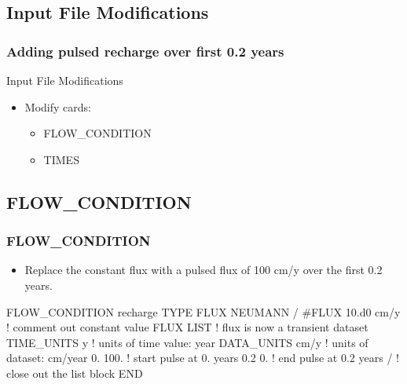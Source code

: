 \documentclass{beamer}
\newcommand\redcomment[1]{{{\color{red} #1}}}
\newcommand\bluecomment[1]{{{\color{blue} #1}}}
\newcommand\magentacomment[1]{{{\color{magenta} #1}}}
\begin{document}
\subsection{Input File Modifications}

\begin{frame}[fragile]\frametitle{Adding pulsed recharge over first 0.2 years}


Input File Modifications
\begin{itemize}
\item Modify cards:
  \begin{itemize}
    \item FLOW\_CONDITION
    \item TIMES
   \end{itemize}
\end{itemize}

\end{frame}

\subsection{FLOW\_CONDITION}

\begin{frame}[fragile]\frametitle{FLOW\_CONDITION}

\begin{itemize}
\item Replace the constant flux with a pulsed flux of 100 cm/y over the first 0.2 years.
\end{itemize}


\begin{semiverbatim}

FLOW_CONDITION recharge
  TYPE
    FLUX NEUMANN
  /
  \magentacomment{#}FLUX 10.d0 cm/y   \bluecomment{! comment out constant value}
  \magentacomment{FLUX LIST          \bluecomment{! flux is now a transient dataset}
    TIME_UNITS y     \bluecomment{! units of time value: \redcomment{year}}
    DATA_UNITS cm/y  \bluecomment{! units of dataset: \redcomment{cm/year}}
    0. 100.          \bluecomment{! start pulse at 0. years}
    0.2 0.           \bluecomment{! end pulse at 0.2 years}
  /}                  \bluecomment{! close out the list block}
END

\end{semiverbatim}

\end{frame}

\end{document}
